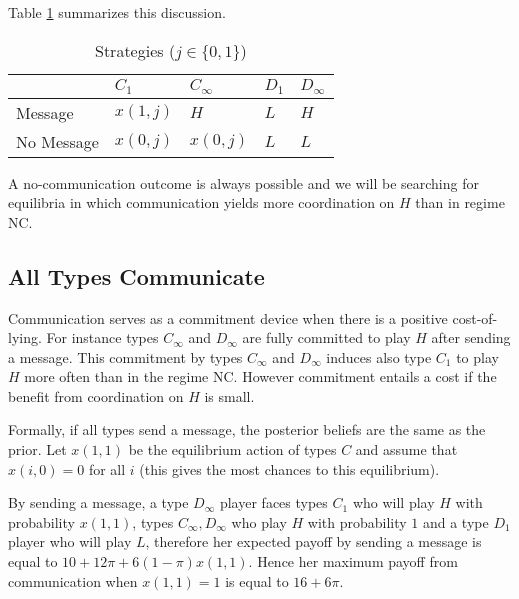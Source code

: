 \documentclass[12pt]{article}
\theoremstyle{definition}
\theoremstyle{remark}
\begin{document}
Table \ref{tbl:strategies} summarizes this discussion. 
\begin{table}
	[htb!] 
	\centering 
	\begin{tabular}{lllll}
		 
		 \textbf{} & \textbf{$C_1$} & \textbf{$C_\infty$} & \textbf{$D_1$} & \textbf{$D_\infty$}\\
		\hline 
		Message 	& $x(1,j)$ & $H$ 	 	& $L$ 	& $H$\\
		No Message 	& $x(0,j)$ & $x(0,j)$ 	& $L $	& $L$\\
		\hline
	\end{tabular}
	\caption{Strategies ($j\in\{0,1\}$)}
	\label{tbl:strategies}
\end{table}
%
A no-communication outcome is always possible and we will be searching for equilibria in which communication yields more coordination on $H$ than in regime NC. %

\subsection{All Types Communicate}
Communication serves as a commitment device when there is a positive cost-of-lying. For instance types $C_\infty$ and $D_\infty$ are fully committed to play $H$ after sending a message. This commitment by types $C_\infty$ and $D_\infty$ induces also type $C_1$ to play $H$ more often than in the regime NC. However commitment entails a cost if the benefit from coordination on $H$ is small.

Formally, if all types send a message, the posterior beliefs are the same as the prior. Let $x(1,1)$ be the equilibrium action of types $C$ and assume that $x(i,0)=0$ for all $i$ (this gives the most chances to this equilibrium).

By sending a message, a type $D_\infty$ player faces types $C_1$ who will play $H$ with probability $x(1,1)$, types $C_\infty,D_\infty$ who play $H$ with probability $1$ and a type $D_1$ player who will play $L$, therefore her  expected payoff by sending a message is equal to  $10+12\pi+6(1-\pi)x(1,1)$. Hence her maximum payoff from communication  when $x(1,1)=1$ is equal to $16+6\pi$.
\end{document}
